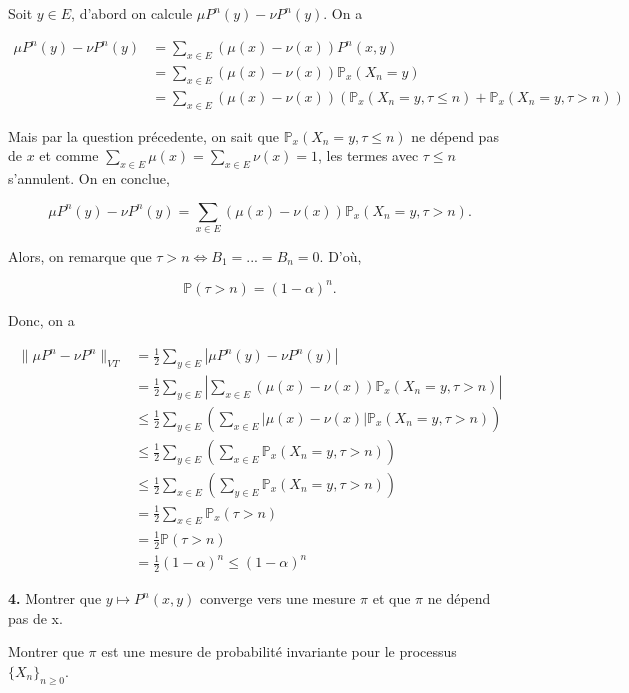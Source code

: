 \documentclass[french]{article}
\begin{document}
	Soit $y \in E$, d'abord on calcule $\mu P^n(y) - \nu P^n(y)$. On a
	
	\begin{align}
		\mu P^n(y) - \nu P^n(y) & = \sum_{x \in E} (\mu(x) - \nu(x))P^n(x, y)\\
		&= \sum_{x \in E} (\mu(x) - \nu(x)) \mathbb{P}_x(X_n = y) \\
		&= \sum_{x \in E} (\mu(x) - \nu(x)) ( \mathbb{P}_x(X_n = y, \tau \leq n) + \mathbb{P}_x(X_n = y, \tau > n) )
	\end{align}
	
	Mais par la question précedente, on sait que $\mathbb{P}_x(X_n = y, \tau \leq n)$ ne dépend pas de $x$ et comme $\sum_{x \in E} \mu(x) = \sum_{x \in E} \nu(x) = 1$, les termes avec $\tau \leq n$ s'annulent. On en conclue,
	
	$$ \mu P^n(y) - \nu P^n(y) = \sum_{x \in E} (\mu(x) - \nu(x)) \mathbb{P}_x(X_n = y, \tau > n). $$
	
	Alors, on remarque que $\tau > n  \iff B_1=...=B_n=0$. D'où, 
	
	$$\mathbb{P}(\tau > n) = (1-\alpha)^n.$$
	
	Donc, on a
	
	\begin{align}
		\| \mu P^n - \nu P^n \|_{VT} &= \frac{1}{2} \sum_{y \in E} |\mu P^n(y) - \nu P^n(y)| \\
		&= \frac{1}{2} \sum_{y \in E} \left| \sum_{x \in E} (\mu(x) - \nu(x)) \mathbb{P}_x(X_n = y, \tau > n)\right| \\
		&\leq \frac{1}{2} \sum_{y \in E} \left(\sum_{x \in E} |\mu(x) - \nu(x)| \mathbb{P}_x(X_n = y, \tau > n)\right) \\
		&\leq \frac{1}{2} \sum_{y \in E} \left(\sum_{x \in E} \mathbb{P}_x(X_n = y, \tau > n)\right) \\
		&\leq \frac{1}{2} \sum_{x \in E} \left(\sum_{y \in E} \mathbb{P}_x(X_n = y, \tau > n)\right) \\
		&= \frac{1}{2} \sum_{x \in E} \mathbb{P}_x(\tau > n)\\
		&= \frac{1}{2} \mathbb{P}(\tau > n) \\
		&= \frac{1}{2}(1-\alpha)^n \leq (1-\alpha)^n
	\end{align}
	
	\begin{tcolorbox}[colback=gray!5!white,colframe=gray!75!black]
		\textbf{4.} Montrer que $y \mapsto P^n(x,y)$ converge vers une mesure $\pi$ et que $\pi$ ne dépend pas de x.
		
		Montrer que $\pi$ est une mesure de probabilité invariante pour le processus $\{X_n\}_{n \geq 0}$.
	\end{tcolorbox}
\end{document}
